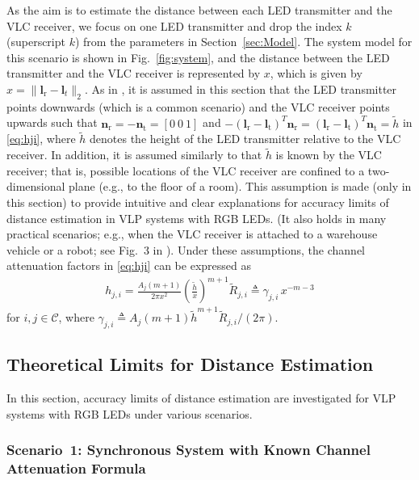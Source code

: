 \documentclass[10pt,twocolumn]{IEEEtran}
\newcommand{\bl}{{\boldsymbol{l}}}
\newcommand{\mtC}{{\mathcal{C}}}
\newcommand{\lr}{{\boldsymbol{l}_{\mathrm{r}}}}
\newcommand{\lt}[1]{{\boldsymbol{l}^{#1}_{\mathrm{t}}}}
\newcommand{\nr}{{\boldsymbol{n}_{\mathrm{r}}}}
\newcommand{\nt}[1]{{\boldsymbol{n}^{#1}_{\mathrm{t}}}}
\begin{document}
As the aim is to estimate the distance between each LED transmitter and the VLC receiver, we focus on one LED transmitter and drop the index $k$ (superscript $k$) from the parameters in Section~\ref{sec:Model}. The system model for this scenario is shown in Fig.~\ref{fig:system}, and the distance between the LED transmitter and the VLC receiver is represented by $x$, which is given by $x=\|\lr-\bl_t\|_2$. As in \cite{MFK_CRLB,VLP_CRLB_RSS,CRB_TOA_VLC,LED_MultiRec}, it is assumed in this section that the LED transmitter points downwards (which is a common scenario) and the VLC receiver points upwards such that $\nr=-\nt{}=[0~0~1]$ and $-(\lr - \lt{})^T \nr=(\lr - \lt{})^T \nt{}=\tilde{h}$ in \eqref{eq:hji},
where $\tilde{h}$ denotes the height of the LED transmitter relative to the VLC receiver. In addition, it is assumed similarly to \cite{MFK_CRLB,VLP_CRLB_RSS,CRB_TOA_VLC,LED_MultiRec} that $\tilde{h}$ is known by the VLC receiver; that is, possible locations of the VLC receiver are confined to a two-dimensional plane (e.g., to the floor of a room). This assumption is made (only in this section) to provide intuitive and clear explanations for accuracy limits of distance estimation in VLP systems with RGB LEDs. (It also holds in many practical scenarios; e.g., when the VLC receiver is attached to a warehouse vehicle or a robot; see Fig.~3 in \cite{VLP_Roadmap}). Under these assumptions, the channel attenuation factors in \eqref{eq:hji} can be expressed as
\begin{gather}\label{eq:hji_2}
h_{j,i}=\frac{A_j(m+1)}{2\pi x^2}\left(\frac{\tilde{h}}{x}\right)^{m+1}\tilde{R}_{j,i}
\triangleq \gamma_{j,i}\,x^{-m-3}
\end{gather}
for $i,j\in\mtC$, where $\gamma_{j,i}\triangleq {A_j(m+1)\tilde{h}^{m+1}\tilde{R}_{j,i}}/{(2\pi)}$.


\subsection{Theoretical Limits for Distance Estimation}\label{sec:Limits}

In this section, accuracy limits of distance estimation are investigated for VLP systems with RGB LEDs under various scenarios.

\subsubsection{Scenario~1: Synchronous System with Known Channel Attenuation Formula}\label{sec:Case1}
\end{document}
